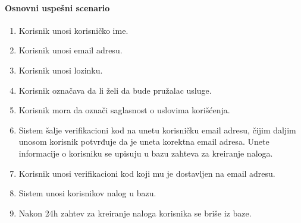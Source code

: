 \documentclass[a4paper,12pt]{report}
\begin{document}
    \paragraph*{Osnovni uspešni scenario}
    \begin{enumerate}
        \item Korisnik unosi korisničko ime.
        \item Korisnik unosi email adresu.
        \item Korisnik unosi lozinku.
        \item Korisnik označava da li želi da bude pružalac usluge.
        \item Korisnik mora da označi saglasnost o uslovima korišćenja.
        \item Sistem šalje verifikacioni kod na unetu korisničku email adresu, čijim daljim unosom korisnik potvrđuje da je uneta korektna email adresa. Unete informacije o korisniku se upisuju u bazu zahteva za kreiranje naloga. 
        \item Korisnik unosi verifikacioni kod koji mu je dostavljen na email adresu.
        \item Sistem unosi korisnikov nalog u bazu.
        \item Nakon 24h zahtev za kreiranje naloga korisnika se briše iz baze.
    \end{enumerate}
\end{document}
